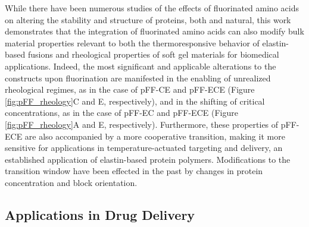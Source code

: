 \begin{refsection}
While there have been numerous studies of the effects of fluorinated amino acids
on altering the stability and structure of proteins, both  and
natural,\cite{Megeed2002,Meyer2002,Wright2002,Simnick2007,Baker2011,URRY1974,Urry1985}
this work demonstrates that the integration of fluorinated amino acids can also
modify bulk material properties relevant to both the thermoresponsive behavior
of elastin-based fusions and rheological properties of soft gel materials for
biomedical applications. Indeed, the most significant and applicable alterations
to the constructs upon fluorination are manifested in the enabling of unrealized
rheological regimes, as in the case of pFF-CE and pFF-ECE (Figure
\ref{fig:pFF_rheology}C and E, respectively), and in the shifting of critical
concentrations, as in the case of pFF-EC and pFF-ECE (Figure
\ref{fig:pFF_rheology}A and E, respectively). Furthermore, these properties of
pFF-ECE are also accompanied by a more cooperative transition, making it more
sensitive for applications in temperature-actuated targeting and delivery, an
established application of elastin-based protein
polymers.\cite{Simnick2007,Chilkoti2002a} Modifications to the transition window
have been effected in the past by changes in protein concentration and block
orientation.\cite{Yamaoka2003,Meyer2002}

\subsection{Applications in Drug Delivery}


\end{refsection}
